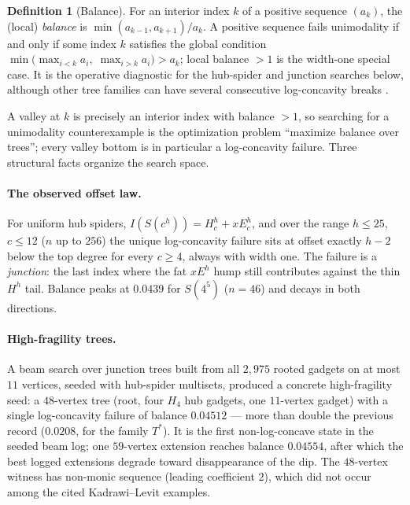 \documentclass[11pt]{article}
\theoremstyle{definition}
\newtheorem{definition}[theorem]{Definition}
\begin{document}
\begin{definition}[Balance]\label{def:balance}
For an interior index $k$ of a positive sequence $(a_k)$, the (local)
\emph{balance} is $\min(a_{k-1},a_{k+1})/a_k$.  A positive sequence
fails unimodality if and only if some index $k$ satisfies the global
condition $\min\bigl(\max_{i<k}a_i,\;\max_{i>k}a_i\bigr)>a_k$; local
balance $>1$ is the width-one special case.  It is the operative
diagnostic for the hub-spider and junction searches below, although
other tree families can have several consecutive log-concavity breaks
\cite{BautistaRamos}.
\end{definition}

A valley at $k$ is precisely an interior index with balance $>1$, so
searching for a unimodality counterexample is the optimization problem
``maximize balance over trees''; every valley bottom is in particular
a log-concavity failure.  Three structural facts organize the search
space.

\paragraph{The observed offset law.}
For uniform hub spiders, $I(S(c^h))=H_c^h+xE_c^h$, and over the range
$h\le25$, $c\le12$ ($n$ up to $256$) the unique log-concavity failure
sits at offset exactly $h-2$ below the top degree for every $c\ge4$,
always with width one.  The failure is a \emph{junction}: the last
index where the fat $xE^h$ hump still contributes against the thin
$H^h$ tail.  Balance peaks at $0.0439$ for $S(4^5)$ ($n=46$) and
decays in both directions.

\paragraph{High-fragility trees.}
A beam search over junction trees built from all $2{,}975$ rooted
gadgets on at most $11$ vertices, seeded with hub-spider multisets,
produced a concrete high-fragility seed: a $48$-vertex tree (root,
four $H_4$ hub gadgets, one $11$-vertex gadget) with a single
log-concavity failure of balance $0.04512$ --- more than double the
previous record ($0.0208$, for the family $T^*$).  It is the first
non-log-concave state in the seeded beam log; one $59$-vertex
extension reaches balance $0.04554$, after which the best logged
extensions degrade toward disappearance of the dip.  The $48$-vertex
witness has non-monic sequence (leading coefficient $2$), which did
not occur among the cited Kadrawi--Levit examples.
\end{document}
